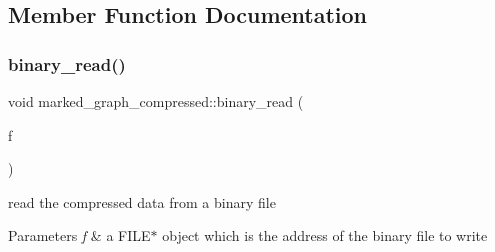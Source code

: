 \subsection{Member Function Documentation}
\mbox{\label{classmarked__graph__compressed_a9db2d11bd63ad3d5a75e47b4023a89dd}} 
\subsubsection{\texorpdfstring{binary\+\_\+read()}{binary\_read()}\hspace{0.1cm}{\footnotesize\ttfamily [1/2]}}
{\footnotesize\ttfamily void marked\+\_\+graph\+\_\+compressed\+::binary\+\_\+read (\begin{DoxyParamCaption}\item[{F\+I\+LE $\ast$}]{f }\end{DoxyParamCaption})}



read the compressed data from a binary file 


\begin{DoxyParams}{Parameters}
{\em f} & a {\ttfamily F\+I\+L\+E$\ast$} object which is the address of the binary file to write \\
\hline
\end{DoxyParams}

